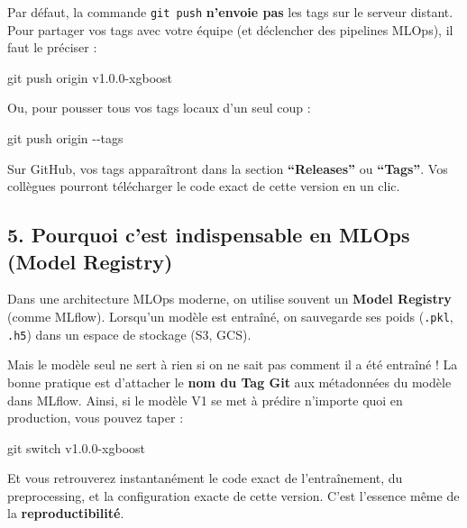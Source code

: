 \documentclass[
  letterpaper,
  DIV=11,
  numbers=noendperiod]{scrreprt}
\newenvironment{Shaded}{\begin{snugshade}}{\end{snugshade}}
\newcommand{\AttributeTok}[1]{\textcolor[rgb]{0.40,0.45,0.13}{#1}}
\newcommand{\FunctionTok}[1]{\textcolor[rgb]{0.28,0.35,0.67}{#1}}
\newcommand{\NormalTok}[1]{\textcolor[rgb]{0.00,0.23,0.31}{#1}}
\begin{document}
Par défaut, la commande \texttt{git\ push} \textbf{n'envoie pas} les
tags sur le serveur distant. Pour partager vos tags avec votre équipe
(et déclencher des pipelines MLOps), il faut le préciser :

\begin{Shaded}
\begin{Highlighting}[]
\FunctionTok{git}\NormalTok{ push origin v1.0.0{-}xgboost}
\end{Highlighting}
\end{Shaded}

Ou, pour pousser tous vos tags locaux d'un seul coup :

\begin{Shaded}
\begin{Highlighting}[]
\FunctionTok{git}\NormalTok{ push origin }\AttributeTok{{-}{-}tags}
\end{Highlighting}
\end{Shaded}

Sur GitHub, vos tags apparaîtront dans la section \textbf{``Releases''}
ou \textbf{``Tags''}. Vos collègues pourront télécharger le code exact
de cette version en un clic.

\subsection{5. Pourquoi c'est indispensable en MLOps (Model
Registry)}\label{pourquoi-cest-indispensable-en-mlops-model-registry}

Dans une architecture MLOps moderne, on utilise souvent un \textbf{Model
Registry} (comme MLflow). Lorsqu'un modèle est entraîné, on sauvegarde
ses poids (\texttt{.pkl}, \texttt{.h5}) dans un espace de stockage (S3,
GCS).

Mais le modèle seul ne sert à rien si on ne sait pas comment il a été
entraîné ! La bonne pratique est d'attacher le \textbf{nom du Tag Git}
aux métadonnées du modèle dans MLflow. Ainsi, si le modèle V1 se met à
prédire n'importe quoi en production, vous pouvez taper :

\begin{Shaded}
\begin{Highlighting}[]
\FunctionTok{git}\NormalTok{ switch v1.0.0{-}xgboost}
\end{Highlighting}
\end{Shaded}

Et vous retrouverez instantanément le code exact de l'entraînement, du
preprocessing, et la configuration exacte de cette version. C'est
l'essence même de la \textbf{reproductibilité}.
\end{document}

